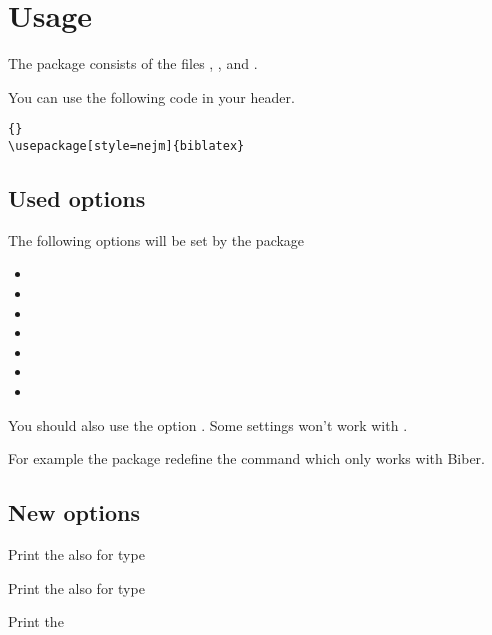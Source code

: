 \documentclass[english]{ltxdockit}
\newcommand*{\biber}{Biber\xspace}
\begin{document}
\section{Usage}
\label{usage}
The package consists of the files , ,  and .

You can use the following code in your header.
\begin{lstlisting}[style=latex]{}
\usepackage[style=nejm]{biblatex}
\end{lstlisting}
\subsection{Used options}
The following options will be set by the package

\kern\baselineskip
\begin{multicols}{2}
\begin{itemize}
 \item {}
 \item {}
 \item {}
 \item {}
 \item {}
 \item {}
 \item {}
\end{itemize}
\end{multicols}

\kern\baselineskip
You should also use the option . Some settings won't work with \bibtex.

\BiberOnlyMark For example the package redefine the command  which only works with \biber.

\subsection{New options}
\begin{optionlist}

Print the  also for type 


Print the  also for type 


Print the 

\end{optionlist}
\end{document}
